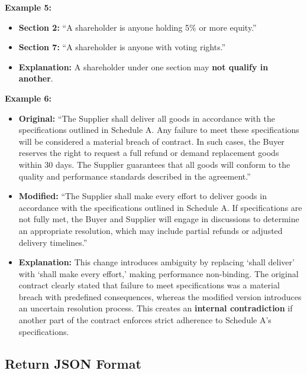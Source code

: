 \documentclass[11pt]{article}
\begin{document}
\begin{tcolorbox}[breakable,colback=lightestgray,colframe=black,title=\textbf{Ambiguity In-Text Data Generation Prompt}]
\textbf{Example 5:}
\begin{itemize}
    \item \textbf{Section 2:} ``A shareholder is anyone holding 5\% or more equity.''
    \item \textbf{Section 7:} ``A shareholder is anyone with voting rights.''
    \item \textbf{Explanation:} A shareholder under one section may \textbf{not qualify in another}.
\end{itemize}

\textbf{Example 6:}
\begin{itemize}
    \item \textbf{Original:} ``The Supplier shall deliver all goods in accordance with the specifications outlined in Schedule A. Any failure to meet these specifications will be considered a material breach of contract. In such cases, the Buyer reserves the right to request a full refund or demand replacement goods within 30 days. The Supplier guarantees that all goods will conform to the quality and performance standards described in the agreement.''
    \item \textbf{Modified:} ``The Supplier shall make every effort to deliver goods in accordance with the specifications outlined in Schedule A. If specifications are not fully met, the Buyer and Supplier will engage in discussions to determine an appropriate resolution, which may include partial refunds or adjusted delivery timelines.''
    \item \textbf{Explanation:} This change introduces ambiguity by replacing `shall deliver' with `shall make every effort,' making performance non-binding. The original contract clearly stated that failure to meet specifications was a material breach with predefined consequences, whereas the modified version introduces an uncertain resolution process. This creates an \textbf{internal contradiction} if another part of the contract enforces strict adherence to Schedule A's specifications.
\end{itemize}

\subsection*{\textbf{Return JSON Format}}


\end{tcolorbox}
\end{document}

